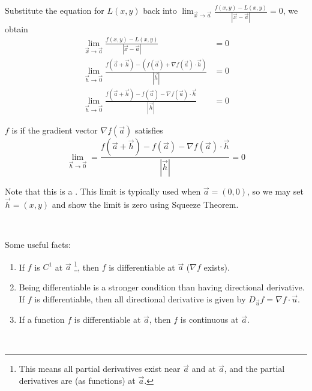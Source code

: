 \documentclass[11pt,fleqn]{book} %
\begin{document}
Substitute the equation for $L(x,y)$ back into $\lim_{\vec{x}\to\vec{a}} \frac{f(x,y) - L(x,y)}{| \vec{x} - \vec{a} |} = 0$, we obtain
\begin{align*}
    \lim_{\vec{x}\to\vec{a}} \frac{f(x,y) - L(x,y)}{| \vec{x} - \vec{a} |}
     & = 0 \\
    \lim_{\vec{h}\to\vec{0}} \frac{f(\vec{a} + \vec{h}) - \left( f(\vec{a}) + \nabla f(\vec{a}) \cdot \vec{h} \right)}{| \vec{h} |}
     & = 0 \\
    \lim_{\vec{h}\to\vec{0}} \frac{f(\vec{a} + \vec{h}) - f(\vec{a}) - \nabla f(\vec{a}) \cdot \vec{h}}{| \vec{h} |}
     & = 0
\end{align*}

\begin{definition}[Differentiable]
    $f$ is  if the gradient vector $\nabla f(\vec{a})$ satisfies $$\lim_{\vec{h} \to \vec{0}} = \frac{f(\vec{a} + \vec{h}) - f(\vec{a}) - \nabla f(\vec{a}) \cdot \vec{h}}{| \vec{h} |} = 0$$
\end{definition}

Note that this is a . This limit is typically used when $\vec{a} = (0, 0)$, so we may set $\vec{h} = (x, y)$ and show the limit is zero using Squeeze Theorem.

{~~~}

Some useful facts:

\begin{enumerate}
    \item If $f$ is $C^1$ at $\vec{a}$ \footnote{This means all partial derivatives exist near $\vec{a}$ and at $\vec{a}$, and the partial derivatives are  (as functions) at $\vec{a}$. }, then $f$ is differentiable at $\vec{a}$ ($\nabla f$ exists). 

    \item Being differentiable is a stronger condition than having directional derivative. If $f$ is differentiable, then all directional derivative is given by $D_{\vec{u}} f = \nabla f \cdot \vec{u}$. 

    \item If a function $f$ is differentiable at $\vec{a}$, then $f$ is continuous at $\vec{a}$.
\end{enumerate}

{~~~}
\end{document}
